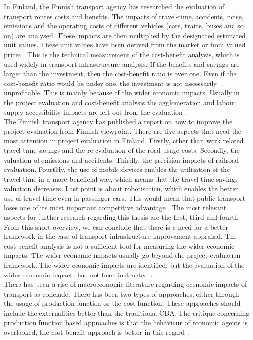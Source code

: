 \documentclass[a4paper, 12 pt]{article}   	%
\begin{document}
In Finland, the Finnish transport agency has researched the evaluation of transport routes costs and benefits. The impacts of travel-time, accidents, noise, emissions and the operating costs of different vehicles (cars, trains, buses and so on) are analysed. These impacts are then multiplied by the designated estimated unit values. These unit values have been derived from the market or from valued prices \citep{liikenne}. This is the technical measurement of the cost-benefit analysis, which is used widely in transport infrastructure analysis. If the benefits and savings are larger than the investment, then the cost-benefit ratio is over one. Even if the cost-benefit ratio would be under one, the investment is not necessarily unprofitable. This is mainly because of the wider economic impacts. Usually in the project evaluation and cost-benefit analysis the agglomeration and labour supply accessibility impacts are left out from the evaluation \citep{goebel}. \\

The Finnish transport agency has published a report on how to improve the project evaluation from Finnish viewpoint. There are five aspects that need the most attention in project evaluation in Finland. Firstly, other than work related travel-time savings and the re-evaluation of the road usage costs. Secondly, the valuation of emissions and accidents. Thirdly, the precision impacts of railroad evaluation. Fourthly, the use of mobile devices enables the utilisation of the travel-time in a more beneficial way, which means that the travel-time savings valuation decreases. Last point is about robotisation, which enables the better use of travel-time even in passenger cars. This would mean that public transport loses one of its most important competitive advantage \citep{goebel}. The most relevant aspects for further research regarding this thesis are the first, third and fourth. \\

From this short overview, we can conclude that there is a need for a better framework in the case of transport infrastructure improvement appraisal. The cost-benefit analysis is not a sufficient tool for measuring the wider economic impacts. The wider economic impacts usually go beyond the project evaluation framework. The wider economic impacts are identified, but the evaluation of the wider economic impacts has not been instructed \citep{laakso}. \\

There has been a rise of macroeconomic literature regarding economic impacts of transport as \cite{andersson} conclude. There has been two types of approaches, either through the usage of production function or the cost function. These approaches should include the externalities better than the traditional CBA. The critique concerning production function based approaches is that the behaviour of economic agents is overlooked, the cost benefit approach is better in this regard \citep{andersson}. \\
\end{document}
